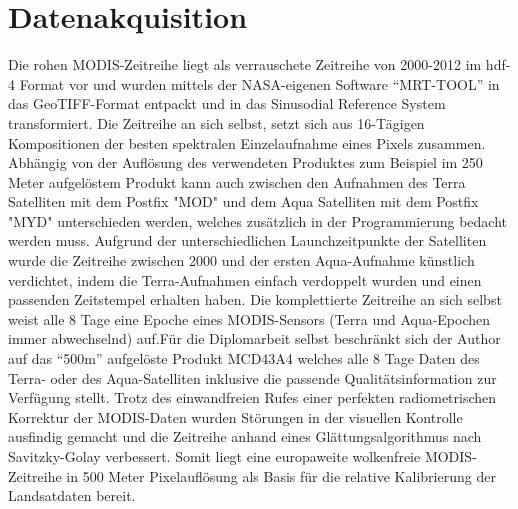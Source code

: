 \documentclass[11pt]{report}
\begin{document}
\section{Datenakquisition}
Die  rohen MODIS-Zeitreihe liegt als verrauschete Zeitreihe von 2000-2012 im hdf-4 Format vor und  wurden mittels der NASA-eigenen Software "`MRT-TOOL"' in das GeoTIFF-Format entpackt und in das Sinusodial Reference System transformiert. Die Zeitreihe an sich selbst, setzt sich aus 16-Tägigen Kompositionen der besten spektralen Einzelaufnahme eines Pixels zusammen. Abhängig von der Auflösung des verwendeten Produktes zum Beispiel im 250 Meter aufgelöstem Produkt kann auch zwischen den Aufnahmen des Terra Satelliten mit dem Postfix "MOD" und dem Aqua Satelliten mit dem Postfix "MYD" unterschieden werden, welches zusätzlich in der Programmierung bedacht werden muss. Aufgrund der unterschiedlichen Launchzeitpunkte der Satelliten wurde die Zeitreihe zwischen 2000 und der ersten Aqua-Aufnahme künstlich verdichtet, indem die Terra-Aufnahmen einfach verdoppelt wurden und einen passenden Zeitstempel erhalten haben. Die komplettierte Zeitreihe an sich selbst weist alle 8 Tage eine Epoche eines MODIS-Sensors (Terra und Aqua-Epochen immer abwechselnd) auf.Für die Diplomarbeit selbst beschränkt sich der Author auf das "`500m"' aufgelöste Produkt MCD43A4 welches alle 8 Tage Daten des Terra- oder des Aqua-Satelliten inklusive die passende Qualitätsinformation zur Verfügung stellt. 
Trotz des einwandfreien Rufes einer perfekten radiometrischen Korrektur der MODIS-Daten wurden Störungen in der visuellen Kontrolle ausfindig gemacht und die Zeitreihe anhand eines Glättungsalgorithmus nach Savitzky-Golay verbessert. Somit liegt eine europaweite wolkenfreie MODIS-Zeitreihe in 500 Meter Pixelauflösung als Basis für die relative Kalibrierung der Landsatdaten bereit.
\end{document}
